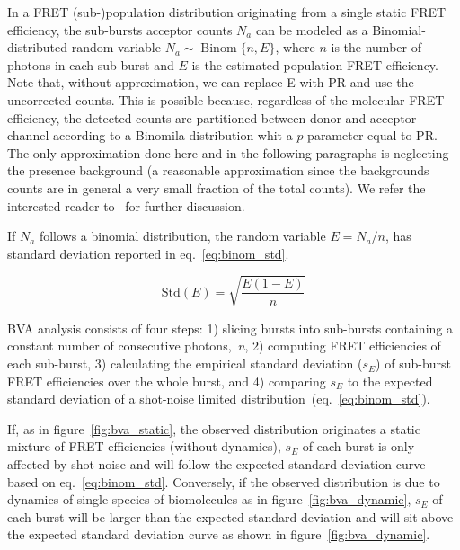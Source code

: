 In a FRET (sub-)population distribution originating from a single static FRET efficiency,
the sub-bursts acceptor counts $N_a$ can be modeled as a Binomial-distributed random variable 
$N_a \sim \operatorname{Binom} \{n, E\}$, where $n$ is the number of photons in each sub-burst and 
$E$ is the estimated population FRET efficiency. Note that, without approximation, we can replace 
E with PR and use the uncorrected counts. This is possible because, regardless of the 
molecular FRET efficiency, the detected counts are partitioned between donor and acceptor channel
according to a Binomila distribution whit a $p$ parameter equal to PR.
The only approximation done here and in the following paragraphs is neglecting the presence background
(a reasonable approximation since the backgrounds counts are in general a very small fraction of
the total counts). 
We refer the interested reader to~\cite{Torella_2011} for further discussion.

If $N_a$ follows a binomial distribution, the random variable $E = N_a/n$,
has standard deviation reported in eq.~\ref{eq:binom_std}. 

\begin{equation}
\label{eq:binom_std}
\operatorname{Std(\textit{E})} = {\sqrt{\frac{E(1 - E)}{n}}}
\end{equation}

BVA analysis consists of four steps: 1) slicing bursts into sub-bursts containing a constant number of consecutive photons,~\textit{n}, 2) computing FRET efficiencies of each sub-burst, 3) calculating the empirical standard deviation ($s_E$) of sub-burst FRET efficiencies over the whole burst, and 4) comparing $s_E$ to the expected standard deviation of a shot-noise limited distribution~(eq.~\ref{eq:binom_std}). 

If, as in figure~\ref{fig:bva_static}, the observed distribution originates a static mixture 
of FRET efficiencies (without dynamics), 
$s_E$ of each burst is only affected by shot noise and will follow the expected standard deviation curve based on eq.~\ref{eq:binom_std}. Conversely, if the observed distribution is due to dynamics of single species of biomolecules as in figure~\ref{fig:bva_dynamic}, $s_E$ of each burst will be larger than the expected standard deviation and will sit above the expected standard deviation curve as shown in figure~\ref{fig:bva_dynamic}.
